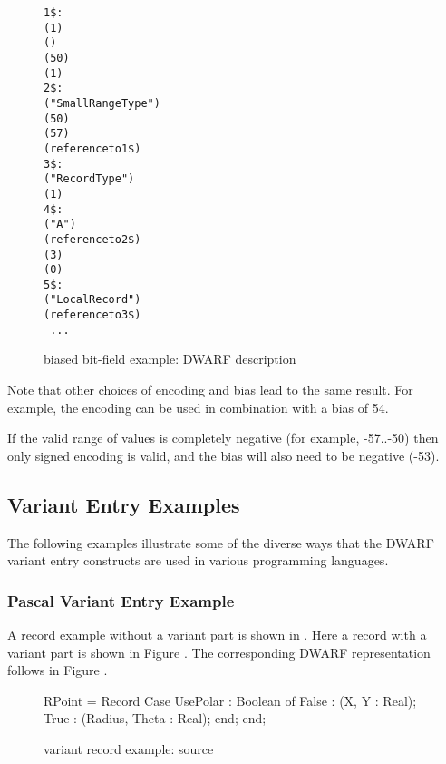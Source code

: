 \begin{figure}[ht]
\begin{dwflisting}
\begin{alltt}
1\$: \DWTAGbasetype
        \DWATbytesize(1)
        \DWATencoding(\DWATEunsigned)
        \DWATbias(50)
        \DWATartificial(1)
2\$: \DWTAGsubrangetype
        \DWATname("SmallRangeType")
        \DWATlowerbound(50)
        \DWATupperbound(57)
        \DWATtype(reference to 1\$)
3\$: \DWTAGstructuretype
        \DWATname("RecordType")
        \DWATbytesize(1)
4\$:    \DWTAGmember
            \DWATname("A")
            \DWATtype(reference to 2\$)
            \DWATbitsize(3)
            \DWATdatabitoffset(0)
5\$: \DWTAGvariable
            \DWATname("LocalRecord")
            \DWATtype(reference to 3\$)
            \DWATlocation\ ...
\end{alltt}
\end{dwflisting}
\caption{\Ada{} biased bit-field example: DWARF description}
\label{fig:adabiasedbitfieldexampledwarfdescription}
\end{figure}

\bb
Note that other choices of encoding and bias lead to the same result. For
example, the \DWATEsigned{} encoding can be used in combination with a bias
of 54.

If the valid range of values is completely negative (for example, -57..-50) then
only signed encoding is valid, and the bias will also need to be negative (-53).
\eb

\bb
\subsection{Variant Entry Examples}
\label{app:variantentryexamples}
The following examples illustrate some of the diverse
ways that the DWARF variant entry constructs are used 
in various programming languages.

\subsubsection{Pascal Variant Entry Example}
\label{app:pascalvariantentryexample}
A \Pascal{} record example without a variant part is shown
in . Here a \Pascal{} record with
a variant part is shown in Figure 
.
The corresponding DWARF representation follows in Figure 
.
\eb

\begin{figure}[ht]
\begin{nlnlisting}
RPoint = Record  
    Case UsePolar : Boolean of  
        False : (X, Y : Real);  
        True : (Radius, Theta : Real);  
        end;
    end; 
\end{nlnlisting}
\caption{\Pascal{} variant record example: source}
\label{fig:pascalvariantrecordexamplesource}
\end{figure}

